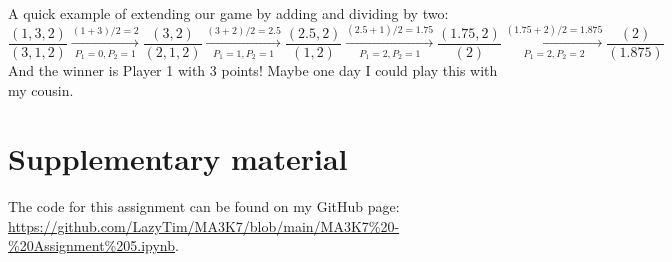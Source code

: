 \documentclass[11pt]{article}
\newcommand{\keywordfont}{\textsc}
\newcommand{\keyword}[1]{%
  \marginpar{\raggedright\small\keywordfont{#1}}}
\begin{document}
A quick example of extending \keyword{Extend} our game by adding and dividing by two:
\[
\frac{(1,3,2) }{(3,1,2)} \xrightarrow[P_1 = 0, P_2 = 1]{(1 + 3)/2 =2} \frac{(3,2) }{(2,1,2)} \xrightarrow[P_1 = 1, P_2 = 1]{(3 + 2)/2 =2.5}
\frac{(2.5,2) }{(1,2)} \xrightarrow[P_1 = 2, P_2 = 1]{(2.5 + 1)/2 =1.75}
\frac{(1.75,2)}{(2)} \xrightarrow[P_1 = 2, P_2 = 2]{(1.75 + 2)/2 =1.875} 
\frac{(2)}{(1.875)}
\]
And the winner is Player 1 with 3 points! Maybe one day I could play this with my cousin.

\section*{Supplementary material}
The code for this assignment can be found on my GitHub page:  \url{https://github.com/LazyTim/MA3K7/blob/main/MA3K7%20-%20Assignment%205.ipynb}.
\end{document}
